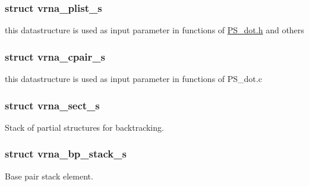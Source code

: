 \subsubsection{struct vrna\+\_\+plist\+\_\+s}
this datastructure is used as input parameter in functions of \hyperlink{PS__dot_8h}{P\+S\+\_\+dot.\+h} and others \label{structvrna__cpair__s}
\hypertarget{group__data__structures_structvrna__cpair__s}{}
\subsubsection{struct vrna\+\_\+cpair\+\_\+s}
this datastructure is used as input parameter in functions of P\+S\+\_\+dot.\+c \label{structvrna__sect__s}
\hypertarget{group__data__structures_structvrna__sect__s}{}
\subsubsection{struct vrna\+\_\+sect\+\_\+s}
Stack of partial structures for backtracking. \label{structvrna__bp__stack__s}
\hypertarget{group__data__structures_structvrna__bp__stack__s}{}
\subsubsection{struct vrna\+\_\+bp\+\_\+stack\+\_\+s}
Base pair stack element. \label{structpu__contrib}
\hypertarget{group__data__structures_structpu__contrib}{}
